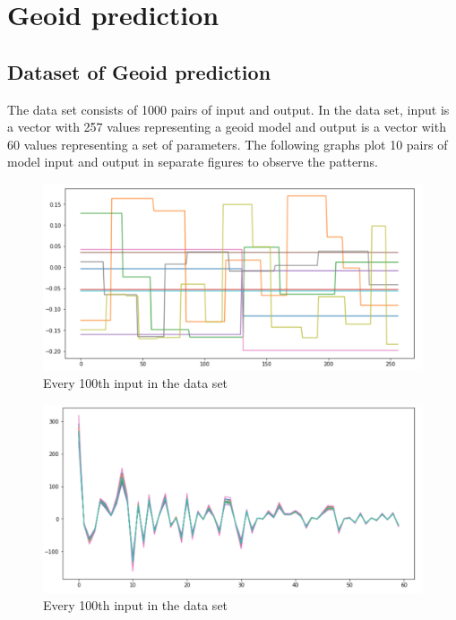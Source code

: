 \chapter{Geoid prediction}\label{chap:content}

\section{Dataset of Geoid prediction}

The data set consists of 1000 pairs of input and output. In the data set, input is a vector with 257 values representing a geoid model and output is a vector with 60 values representing a set of parameters. The following graphs plot 10 pairs of model input and output in separate figures to observe the patterns.

\begin{figure}[H]
    \caption{Every 100th input in the data set}
    \includegraphics[scale=0.6]{figures/geoid_images/Geoid_sample_input.png}
\end{figure}

\begin{figure}[H]
    \caption{Every 100th input in the data set}
    \includegraphics[scale=0.6]{figures/geoid_images/Geoid_sample_output.png}
\end{figure}

